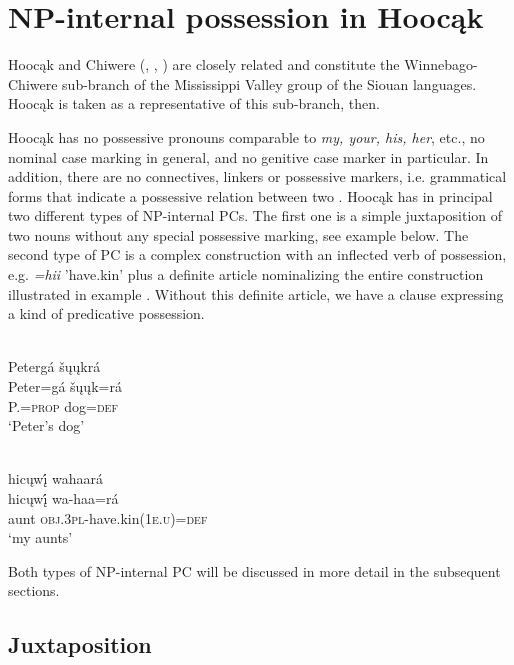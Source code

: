 \documentclass[output=paper]{LSP/langsci}
\begin{document}
\section{NP-internal possession in Hoocąk}

Hoocąk and Chiwere (, , ) are closely related and constitute the Winnebago-Chiwere sub-branch of the Mississippi Valley group of the Siouan languages. Hoocąk is taken as a representative of this sub-branch, then. 

Hoocąk has no possessive pronouns comparable to  \textit{my, your, his, her}, etc., no nominal case marking in general, and no genitive case marker in particular. In addition, there are no connectives, linkers or possessive markers, i.e. grammatical forms that indicate a possessive relation between two . Hoocąk has in principal two different types of NP-internal PCs. The first one is a simple juxtaposition of two nouns without any special possessive marking, see example  below. The second type of PC is a complex construction with an inflected verb of possession, e.g. \textit{=hii} 'have.kin' plus a definite article nominalizing the entire construction illustrated in example . Without this definite article, we have a clause expressing a kind of predicative possession. 

\ea  \label{petersdog}
 {}{\citealt[16]{Helmbrecht2003}} \\
\ea
\glll Petergá šųųkrá\\
Peter=gá     šųųk=rá \\
P.=\textsc{prop}    dog=\textsc{def} \\
\glt `Peter's dog'

\ex	 \label{myaunts}
 {}{\citealt[19]{Helmbrecht2003}} \\
\glll hicųwį́ wahaará\\
hicųwį́  wa-haa=rá \\
aunt     \textsc{obj.3pl}-have.kin(\textsc{1e.u})=\textsc{def} \\
\glt `my aunts'
\z
\z

Both types of NP-internal PC will be discussed in more detail in the subsequent sections.

\subsection{Juxtaposition}\label{sec:helmbrecht:3.1}
\end{document}
